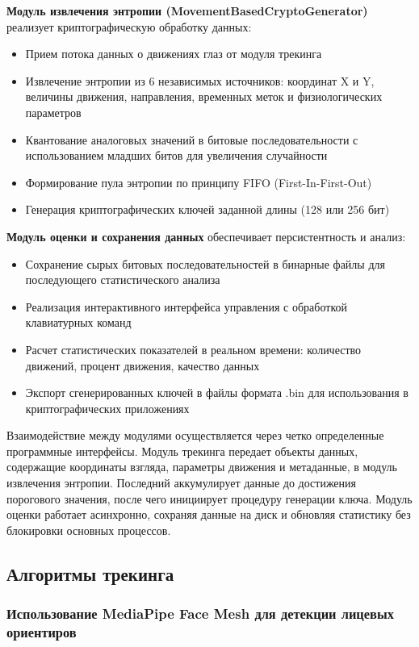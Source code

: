 \documentclass[14pt, a4paper]{extreport}
\begin{document}
\textbf{Модуль извлечения энтропии (MovementBasedCryptoGenerator)} реализует криптографическую обработку данных:
\begin{itemize}
    \item Прием потока данных о движениях глаз от модуля трекинга
    \item Извлечение энтропии из 6 независимых источников: координат X и Y, величины движения, направления, временных меток и физиологических параметров
    \item Квантование аналоговых значений в битовые последовательности с использованием младших битов для увеличения случайности
    \item Формирование пула энтропии по принципу FIFO (First-In-First-Out)
    \item Генерация криптографических ключей заданной длины (128 или 256 бит)
\end{itemize}

\textbf{Модуль оценки и сохранения данных} обеспечивает персистентность и анализ:
\begin{itemize}
    \item Сохранение сырых битовых последовательностей в бинарные файлы для последующего статистического анализа
    \item Реализация интерактивного интерфейса управления с обработкой клавиатурных команд
    \item Расчет статистических показателей в реальном времени: количество движений, процент движения, качество данных
    \item Экспорт сгенерированных ключей в файлы формата .bin для использования в криптографических приложениях
\end{itemize}

Взаимодействие между модулями осуществляется через четко определенные программные интерфейсы. Модуль трекинга передает объекты данных, содержащие координаты взгляда, параметры движения и метаданные, в модуль извлечения энтропии. Последний аккумулирует данные до достижения порогового значения, после чего инициирует процедуру генерации ключа. Модуль оценки работает асинхронно, сохраняя данные на диск и обновляя статистику без блокировки основных процессов.

\subsection{Алгоритмы трекинга}

\subsubsection{Использование MediaPipe Face Mesh для детекции лицевых ориентиров}
\end{document}
